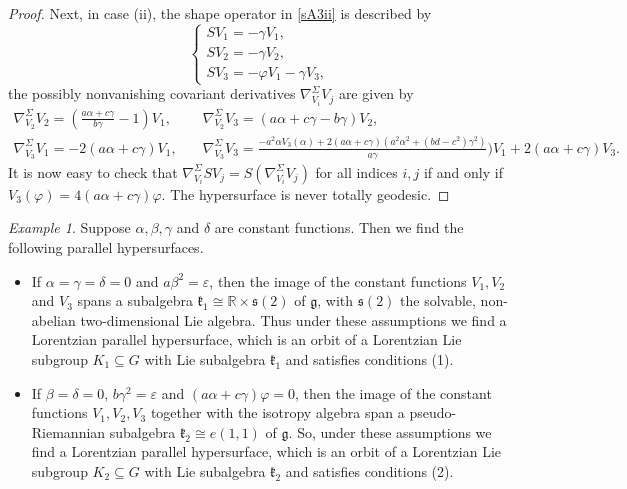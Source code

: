 \documentclass{amsart}
\theoremstyle{plain}
\theoremstyle{remark}
\newtheorem{example}{Example}
\newcommand\g{{\mathfrak{g}}}
\begin{document}
{\begin{proof}
Next, in case (ii), the shape operator in \eqref{sA3ii} is described by
%
\[
\left\{
\begin{array}{l}
SV_1 =  -\gamma V_1, \\[2 pt]
SV_2 =  -\gamma V_2, \\[2 pt]
SV_3 =  -\varphi V_1 - \gamma V_3,
\end{array}
\right.
\]
the possibly nonvanishing covariant derivatives $\nabla^\Sigma _{V_i} V_j$ are given by 
%
\[
\begin{array}{ll}
\nabla^\Sigma _{V_2} V_2 = \left(\frac{a\alpha+c\gamma}{b\gamma} - 1 \right) V_1, \quad &
\nabla^\Sigma _{V_2} V_3 = (a\alpha+c\gamma-b\gamma)V_2,\\[6 pt]
\nabla^\Sigma _{V_3} V_1 = -2(a\alpha+c\gamma)V_1,\quad &
\nabla^\Sigma _{V_3} V_3 = \frac{-a^2\alpha V_3(\alpha) + 2(a\alpha+c\gamma)(a^2\alpha^2+(bd-c^2)\gamma^2)}{a\gamma})V_1 + 2(a\alpha + c\gamma)V_3.
\end{array}
\]
It is now easy to check that $\nabla^\Sigma _{V_i} SV_j=S (\nabla^\Sigma _{V_i} V_j)$ for all indices $i,j$ if and only if $V_3(\varphi) = 4(a\alpha+c\gamma)\varphi$. The hypersurface is never totally geodesic. 
\end{proof}



\begin{example}
	Suppose $\alpha,\beta,\gamma$ and $\delta$ are constant functions. Then we find the following parallel hypersurfaces.
	\begin{itemize}
		\item If $\alpha =\gamma = \delta = 0$ and $a\beta^2=\varepsilon$, then the image of the constant functions $V_1,V_2$ and $V_3$ spans a subalgebra  $\mathfrak{k}_1 \cong \mathbb{R} \times \mathfrak{s}(2)$ of $\g$, with $\mathfrak{s}(2)$ the solvable, non-abelian two-dimensional Lie algebra. Thus under these assumptions we find a Lorentzian parallel hypersurface, which is an orbit of a Lorentzian Lie subgroup $K_1 \subseteq G$ with Lie subalgebra $\mathfrak{k}_1$ and satisfies conditions (1).
		\item If $\beta = \delta = 0$, $b\gamma^2=\varepsilon$ and $(a\alpha + c\gamma)\varphi = 0$,  then the image of the constant functions $V_1,V_2,V_3$ together with the isotropy algebra span a pseudo-Riemannian subalgebra  
		$\mathfrak{k}_2 \cong e(1,1)$ of $\g$. So, under these assumptions we find a Lorentzian parallel hypersurface, which is an orbit of a Lorentzian Lie subgroup $K_2 \subseteq G$ with Lie subalgebra $\mathfrak{k}_2$ and satisfies conditions (2).
	\end{itemize}
\end{example}

}
\end{document}
